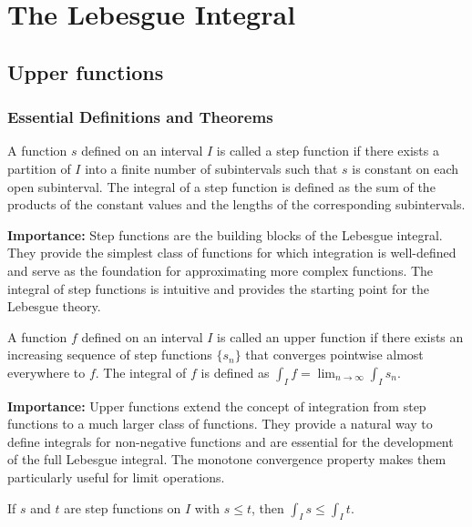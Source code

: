 \chapter{The Lebesgue Integral}

\section{Upper functions}

\subsection*{Essential Definitions and Theorems}

\begin{definition}
A function $s$ defined on an interval $I$ is called a step function if there exists a partition of $I$ into a finite number of subintervals such that $s$ is constant on each open subinterval. The integral of a step function is defined as the sum of the products of the constant values and the lengths of the corresponding subintervals.
\end{definition}

\noindent\textbf{Importance:} Step functions are the building blocks of the Lebesgue integral. They provide the simplest class of functions for which integration is well-defined and serve as the foundation for approximating more complex functions. The integral of step functions is intuitive and provides the starting point for the Lebesgue theory.



\begin{definition}
A function $f$ defined on an interval $I$ is called an upper function if there exists an increasing sequence of step functions $\{s_n\}$ that converges pointwise almost everywhere to $f$. The integral of $f$ is defined as $\int_I f = \lim_{n \to \infty} \int_I s_n$.
\end{definition}

\noindent\textbf{Importance:} Upper functions extend the concept of integration from step functions to a much larger class of functions. They provide a natural way to define integrals for non-negative functions and are essential for the development of the full Lebesgue integral. The monotone convergence property makes them particularly useful for limit operations.



\begin{theorem}
If $s$ and $t$ are step functions on $I$ with $s \leq t$, then $\int_I s \leq \int_I t$.
\end{theorem}

